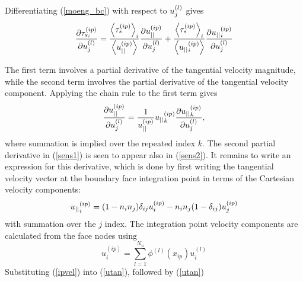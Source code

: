 Differentiating (\ref{moeng_bc}) with respect to $u_{j}^{(l)}$ gives
\begin{equation} \label{sens1}
  \frac{\partial \tau_{s_i}^{(ip)}}{\partial u_{j}^{(l)}} =
  \frac{\left<\tau_s^{(ip)}\right>_i}{\left<u_{||}^{(ip)}\right>}
  \frac{\partial u_{||}^{(ip)}}{\partial u_{j}^{(l)}} +
  \frac{\left<\tau_s^{(ip)}\right>_i}{\left<{u_{||}}_i^{(ip)}\right>}\frac{\partial {u_{||}}_i^{(ip)}}{\partial u_{j}^{(l)}}
\end{equation}

The first term involves a partial derivative of the tangential
velocity magnitude, while the second term involves the partial
derivative of the tangential velocity component.  Applying the chain
rule to the first term gives
\begin{equation} \label{sens2}
 \frac{\partial u_{||}^{(ip)}}{\partial u_{j}^{(l)}} = \frac{1}{u_{||}^{(ip)}}
   {u_{||}}_k^{(ip)} \frac{\partial {u_{||}}_k^{(ip)}}{\partial u_{j}^{(l)}},
\end{equation}
where summation is implied over the repeated index $k$.  The second
partial derivative in (\ref{sens1}) is seen to appear also in
(\ref{sens2}).  It remains to write an expression for this
derivative, which is done by first writing the tangential velocity
vector at the boundary face integration point in terms of the
Cartesian velocity components:
\begin{equation} \label{utan}
{u_{||}}_i^{(ip)} = (1 - n_i n_j)\delta_{ij} u_i^{(ip)} - n_i n_j (1 -
\delta_{ij}) u_j^{(ip)}
\end{equation}
with summation over the $j$ index.  The integration point velocity
components are calculated from the face nodes using
\begin{equation} \label{ipvel}
 u_i^{(ip)} = \sum_{l=1}^{N_n} \phi^{(l)}(x_{ip})u_i^{(l)}
\end{equation}
Substituting (\ref{ipvel}) into (\ref{utan}), followed by (\ref{utan})
